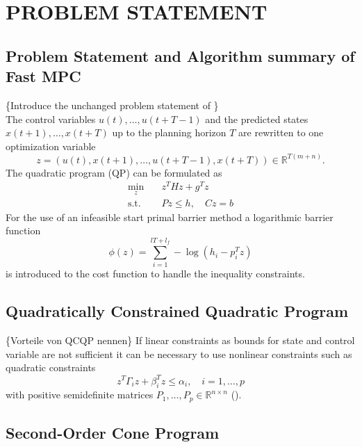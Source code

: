 \documentclass[letterpaper, 10 pt, conference]{ieeeconf}  %
\begin{document}
\section{PROBLEM STATEMENT}

\subsection{Problem Statement and Algorithm  summary of Fast MPC}

\{Introduce the unchanged problem statement of \cite{c1}\}\\
The control variables $u(t),\dots, u(t+T-1)$ and the predicted states $x(t+1),\dots, x(t+T)$ up to the planning horizon $T$ are rewritten to one optimization variable
\begin{equation*}
  z = (u(t),x(t+1),\dots,u(t+T-1),x(t+T))\in \mathbb{R}^{T(m+n)}.
\end{equation*}
The quadratic program (QP) can be formulated as
\begin{equation}\begin{split}
  \underset{z}{\text{min}}\quad &z^{T}Hz + g^{T}z\\
  \text{s.t.} \quad &Pz \leq h,\quad Cz=b
\end{split}\end{equation}
For the use of an infeasible start primal barrier method a logarithmic barrier function
\begin{equation}
  \phi(z)=\sum_{i=1}^{lT+l_{f}}-\log \left ( h_{i}-p_{i}^Tz \right )
\end{equation}
 is introduced to the cost function to handle the inequality constraints.

\subsection{Quadratically Constrained Quadratic Program}

\{Vorteile von QCQP nennen\}
If linear constraints as bounds for state and control variable are not sufficient it can be necessary to use nonlinear constraints such as quadratic constraints
\begin{equation}
\label{eq:qc}
 z^{T}\Gamma_{i} z+\beta_{i}^{T}z\leq\alpha_{i},\quad i=1, \dots, p
\end{equation}
with positive semidefinite matrices $P_{1},\dots,P_{p} \in \mathbb{R}^{n\times n}$ (\cite{c7}).
\subsection{Second-Order Cone Program}
\end{document}
